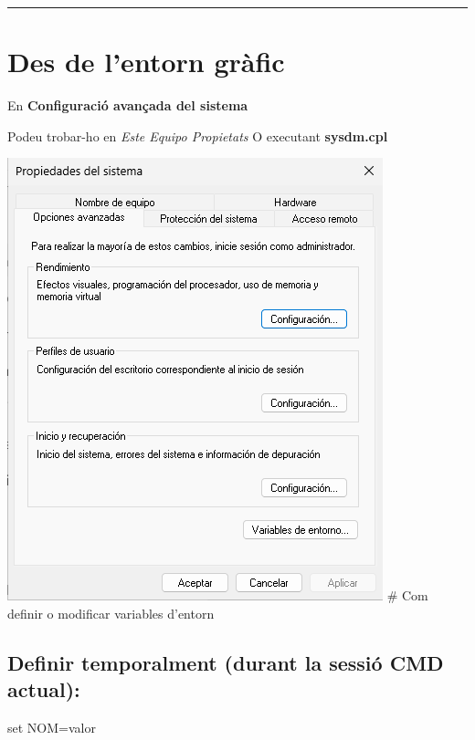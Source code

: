 \documentclass[
  a4paper,
]{article}
\newenvironment{Shaded}{\begin{snugshade}}{\end{snugshade}}
\newcommand{\BuiltInTok}[1]{#1}
\newcommand{\NormalTok}[1]{#1}
\newcommand{\VariableTok}[1]{\textcolor[rgb]{0.00,0.00,0.00}{#1}}
\begin{document}
\begin{center}\rule{0.5\linewidth}{0.5pt}\end{center}

\section{Des de l'entorn gràfic}\label{des-de-lentorn-gruxe0fic}

En \textbf{Configuració avançada del sistema}

Podeu trobar-ho en \emph{Este Equipo \textbar{} Propietats} O executant
\textbf{sysdm.cpl}

\includegraphics{sysdmcpl.png} \# Com definir o modificar variables
d'entorn

\subsection{Definir temporalment (durant la sessió CMD
actual):}\label{definir-temporalment-durant-la-sessiuxf3-cmd-actual}

\begin{Shaded}
\begin{Highlighting}[]
\BuiltInTok{set} \VariableTok{NOM}\NormalTok{=valor}
\end{Highlighting}
\end{Shaded}
\end{document}
